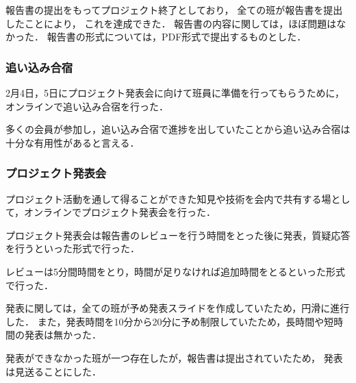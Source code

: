 報告書の提出をもってプロジェクト終了としており，
全ての班が報告書を提出したことにより，
これを達成できた．
報告書の内容に関しては，ほぼ問題はなかった．
報告書の形式については，PDF形式で提出するものとした．

\subsubsection*{追い込み合宿}
2月4日，5日にプロジェクト発表会に向けて班員に準備を行ってもらうために，オンラインで追い込み合宿を行った．

多くの会員が参加し，追い込み合宿で進捗を出していたことから追い込み合宿は十分な有用性があると言える．

\subsubsection*{プロジェクト発表会}

プロジェクト活動を通して得ることができた知見や技術を会内で共有する場として，オンラインでプロジェクト発表会を行った．

プロジェクト発表会は報告書のレビューを行う時間をとった後に発表，質疑応答を行うといった形式で行った．

レビューは5分間時間をとり，時間が足りなければ追加時間をとるといった形式で行った．

発表に関しては，全ての班が予め発表スライドを作成していたため，円滑に進行した．
また，発表時間を10分から20分に予め制限していたため，長時間や短時間の発表は無かった．

発表ができなかった班が一つ存在したが，報告書は提出されていたため，
発表は見送ることにした．
